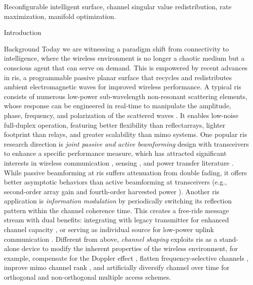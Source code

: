 \documentclass[journal]{IEEEtran}
\begin{document}
\begin{IEEEkeywords}
	Reconfigurable intelligent surface, channel singular value redistribution, rate maximization, manifold optimization.
\end{IEEEkeywords}

\glsresetall

\begin{section}{Introduction}
	\begin{subsection}{Background}
		Today we are witnessing a paradigm shift from connectivity to intelligence, where the wireless environment is no longer a chaotic medium but a conscious agent that can serve on demand.
		This is empowered by recent advances in \gls{ris}, a programmable passive planar surface that recycles and redistributes ambient electromagnetic waves for improved wireless performance.
		A typical \gls{ris} consists of numerous low-power sub-wavelength non-resonant scattering elements, whose response can be engineered in real-time to manipulate the amplitude, phase, frequency, and polarization of the scattered waves \cite{Basar2019}.
		It enables low-noise full-duplex operation, featuring better flexibility than reflectarrays, lighter footprint than relays, and greater scalability than \gls{mimo} systems.
		One popular \gls{ris} research direction is \emph{joint passive and active beamforming} design with transceivers to enhance a specific performance measure, which has attracted significant interests in wireless communication \cite{Wu2019,Guo2020,Liu2022}, sensing \cite{He2022,Luo2022,Hua2023}, and power transfer literature \cite{Wu2020a,Feng2022,Zhao2022}.
		While passive beamforming at \gls{ris} suffers attenuation from double fading, it offers better asymptotic behaviors than active beamforming at transceivers (e.g., second-order array gain and fourth-order harvested power \cite{Zhao2022}).
		Another \gls{ris} application is \emph{information modulation} by periodically switching its reflection pattern within the channel coherence time.
		This creates a free-ride message stream with dual benefits: integrating with legacy transmitter for enhanced channel capacity \cite{Karasik2020,Basar2020,Ye2022}, or serving as individual source for low-power uplink communication \cite{Liang2020,Zhao2024,Yang2024}.
		Different from above, \emph{channel shaping} exploits \gls{ris} as a stand-alone device to modify the inherent properties of the wireless environment, for example, compensate for the Doppler effect \cite{Basar2021}, flatten frequency-selective channels \cite{Arslan2022}, improve \gls{mimo} channel rank \cite{Ozdogan2020a}, and artificially diversify channel over time for orthogonal \cite{Yang2019} and non-orthogonal \cite{Chen2023} multiple access schemes.

\end{subsection}
\end{section}
\end{document}
